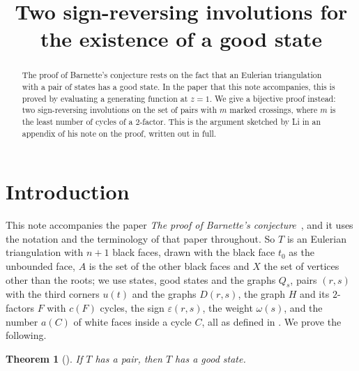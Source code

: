 \documentclass[a4paper]{amsart}
\title{Two sign-reversing involutions for the existence of a good state}
\author{}
\newtheorem{theorem}{Theorem}
\newcommand{\eps}{\varepsilon}
\begin{document}
\begin{abstract}
The proof of Barnette's conjecture rests on the fact that an Eulerian triangulation with a pair of states has a good state.
In the paper that this note accompanies, this is proved by evaluating a generating function at $z=1$.
We give a bijective proof instead: two sign-reversing involutions on the set of pairs with $m$ marked crossings, where $m$ is the least number of cycles of a $2$-factor.
This is the argument sketched by Li in an appendix of his note on the proof, written out in full.
\end{abstract}

\maketitle

\section{Introduction}

This note accompanies the paper \emph{The proof of Barnette's conjecture}~\cite{P}, and it uses the notation and the terminology of that paper throughout.
So $T$ is an Eulerian triangulation with $n+1$ black faces, drawn with the black face $t_0$ as the unbounded face, $A$ is the set of the other black faces and $X$ the set of vertices other than the roots; we use states, good states and the graphs $Q_s$, pairs $(r,s)$ with the third corners $u(t)$ and the graphs $D(r,s)$, the graph $H$ and its $2$-factors $F$ with $c(F)$ cycles, the sign $\eps(r,s)$, the weight $\omega(s)$, and the number $a(C)$ of white faces inside a cycle $C$, all as defined in \cite[Sections~2 to~6]{P}.
We prove the following.

\begin{theorem}[{\cite[Proposition~6.9]{P}}]\label{main}
If $T$ has a pair, then $T$ has a good state.
\end{theorem}
\end{document}
